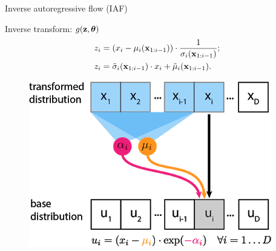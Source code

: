 \begin{frame}{Inverse autoregressive flow (IAF)}
	\begin{minipage}[t]{0.65\columnwidth}
		\begin{block}{Inverse transform: $g(\mathbf{z}, \boldsymbol{\theta})$}
			\vspace{-0.5cm}
			\begin{align*}
				z_i &= (x_i - \mu_i(\mathbf{x}_{1:i-1})) \cdot \frac{1}{\sigma_i (\mathbf{x}_{1:i-1}) }; \\
				z_i &= \tilde{\sigma}_i (\mathbf{x}_{1:i-1}) \cdot x_i + \tilde{\mu}_i(\mathbf{x}_{1:i-1}).
			\end{align*}
			\vspace{-0.4cm}
		\end{block}
	\end{minipage}%
	\begin{minipage}[t]{0.35\columnwidth}
		\begin{figure}[h]
			\centering
			\includegraphics[width=.9\linewidth]{figs/maf_iaf_explained_2.png}
		\end{figure}
	\end{minipage}\\
	\vspace{0.1cm}
	

\end{frame}
